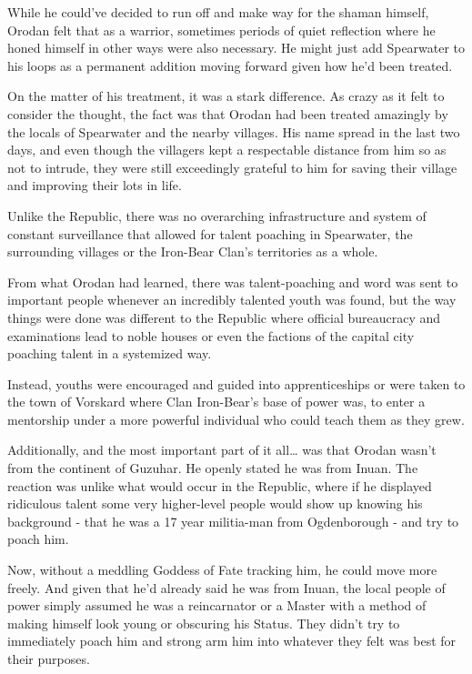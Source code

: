 \documentclass[a4paper,10pt]{book}
\begin{document}
While he could’ve decided to run off and make way for the shaman himself, Orodan felt that as a warrior, sometimes periods of quiet reflection where he honed himself in other ways were also necessary. He might just add Spearwater to his loops as a permanent addition moving forward given how he’d been treated.\par
On the matter of his treatment, it was a stark difference. As crazy as it felt to consider the thought, the fact was that Orodan had been treated amazingly by the locals of Spearwater and the nearby villages. His name spread in the last two days, and even though the villagers kept a respectable distance from him so as not to intrude, they were still exceedingly grateful to him for saving their village and improving their lots in life.\par
Unlike the Republic, there was no overarching infrastructure and system of constant surveillance that allowed for talent poaching in Spearwater, the surrounding villages or the Iron-Bear Clan’s territories as a whole.\par
From what Orodan had learned, there was talent-poaching and word was sent to important people whenever an incredibly talented youth was found, but the way things were done was different to the Republic where official bureaucracy and examinations lead to noble houses or even the factions of the capital city poaching talent in a systemized way.\par
Instead, youths were encouraged and guided into apprenticeships or were taken to the town of Vorskard where Clan Iron-Bear’s base of power was, to enter a mentorship under a more powerful individual who could teach them as they grew.\par
Additionally, and the most important part of it all… was that Orodan wasn’t from the continent of Guzuhar. He openly stated he was from Inuan. The reaction was unlike what would occur in the Republic, where if he displayed ridiculous talent some very higher-level people would show up knowing his background - that he was a 17 year militia-man from Ogdenborough - and try to poach him.\par
Now, without a meddling Goddess of Fate tracking him, he could move more freely. And given that he’d already said he was from Inuan, the local people of power simply assumed he was a reincarnator or a Master with a method of making himself look young or obscuring his Status. They didn’t try to immediately poach him and strong arm him into whatever they felt was best for their purposes.\par
\end{document}
